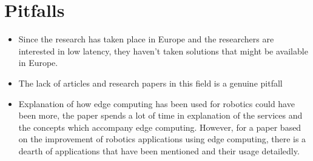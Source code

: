 \documentclass{article}
\begin{document}
\section{Pitfalls}
\begin{itemize}
\item Since the research has taken place in Europe and the researchers are interested in low latency, they haven't taken solutions that might be available in Europe.
\end{itemize}
\begin{itemize}
    \item The lack of articles and research papers in this field is a genuine pitfall
\end{itemize}
\begin{itemize}
    \item Explanation of how edge computing has been used for robotics could have been more, the paper spends a lot of time in explanation of the services and the concepts which accompany edge computing. However, for a paper based on the improvement of robotics applications using edge computing, there is a dearth of applications that have been mentioned and their usage detailedly.
\end{itemize}
\end{document}
